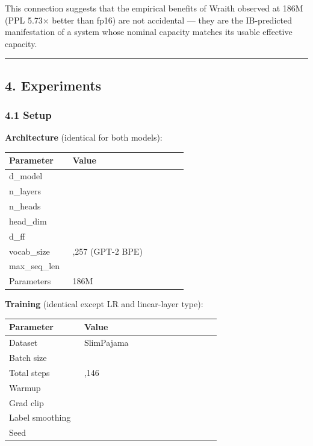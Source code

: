 This connection suggests that the empirical benefits of Wraith observed
at 186M (PPL 5.73× better than fp16) are not accidental --- they are the
IB-predicted manifestation of a system whose nominal capacity matches
its usable effective capacity.

\begin{center}\rule{0.5\linewidth}{0.5pt}\end{center}

\subsection{4. Experiments}\label{experiments}

\subsubsection{4.1 Setup}\label{setup}

\textbf{Architecture} (identical for both models):

{\def\LTcaptype{none} %
{\footnotesize\setlength{\tabcolsep}{3pt}
\begin{longtable}[]{@{}>{\raggedright\arraybackslash}p{0.33\linewidth}>{\raggedright\arraybackslash}p{0.60\linewidth}@{}}
\toprule\noalign{}
Parameter & Value \\
\midrule\noalign{}
\endhead
\bottomrule\noalign{}
\endlastfoot
d\_model & 1024 \\
n\_layers & 8 \\
n\_heads & 16 \\
head\_dim & 64 \\
d\_ff & 4096 \\
vocab\_size & 50,257 (GPT-2 BPE) \\
max\_seq\_len & 1024 \\
Parameters & 186M \\
\end{longtable}
}
}

\textbf{Training} (identical except LR and linear-layer type):

{\def\LTcaptype{none} %
{\footnotesize\setlength{\tabcolsep}{3pt}
\begin{longtable}[]{@{}>{\raggedright\arraybackslash}p{0.33\linewidth}>{\raggedright\arraybackslash}p{0.60\linewidth}@{}}
\toprule\noalign{}
Parameter & Value \\
\midrule\noalign{}
\endhead
\bottomrule\noalign{}
\endlastfoot
Dataset & SlimPajama \\
Batch size & 128 \\
Total steps & 38,146 \\
Warmup & 0 \\
Grad clip & 1.0 \\
Label smoothing & 0.02 \\
Seed & 0 \\
\end{longtable}
}
}

